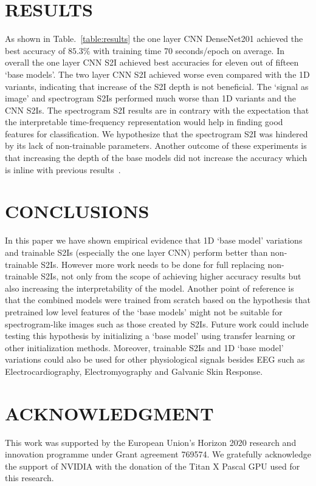 \documentclass[conference]{IEEEtran}
\begin{document}
\section{RESULTS}
As shown in Table.~\ref{table:results} the one layer CNN DenseNet201 achieved the best accuracy of $85.3\%$ with training time 70 seconds/epoch on average.
In overall the one layer CNN S2I achieved best accuracies for eleven out of fifteen `base models'.
The two layer CNN S2I achieved worse even compared with the 1D variants, indicating that increase of the S2I depth is not beneficial.
The `signal as image' and spectrogram S2Is performed much worse than 1D variants and the CNN S2Is.
The spectrogram S2I results are in contrary with the expectation that the interpretable time-frequency representation would help in finding good features for classification.
We hypothesize that the spectrogram S2I was hindered by its lack of non-trainable parameters.
Another outcome of these experiments is that increasing the depth of the base models did not increase the accuracy which is inline with previous results~\cite{schirrmeister2017deep}.

\section{CONCLUSIONS}
In this paper we have shown empirical evidence that 1D `base model' variations and trainable S2Is (especially the one layer CNN) perform better than non-trainable S2Is.
However more work needs to be done for full replacing non-trainable S2Is, not only from the scope of achieving higher accuracy results but also increasing the interpretability of the model.
Another point of reference is that the combined models were trained from scratch based on the hypothesis that pretrained low level features of the `base models' might not be suitable for spectrogram-like images such as those created by S2Is.
Future work could include testing this hypothesis by initializing a `base model' using transfer learning or other initialization methods.
Moreover, trainable S2Is and 1D `base model' variations could also be used for other physiological signals besides EEG such as Electrocardiography, Electromyography and Galvanic Skin Response.

\section*{ACKNOWLEDGMENT}
This work was supported by the European Union's Horizon 2020 research and innovation programme under Grant agreement 769574.
We gratefully acknowledge the support of NVIDIA with the donation of the Titan X Pascal GPU used for this research.



\end{document}
